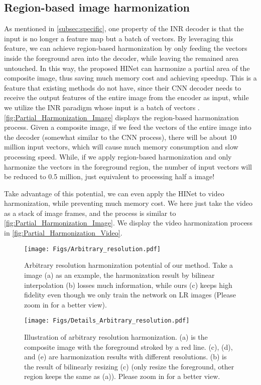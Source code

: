 \documentclass[10pt,journal,twocolumn,twoside]{IEEEtran}
\begin{document}
\subsection{Region-based image harmonization}
As mentioned in \cref{subsec:specific}, one property of the INR decoder is that the input is no longer a feature map but a batch of vectors. By leveraging this feature, we can achieve region-based harmonization by only feeding the vectors inside the foreground area into the decoder, while leaving the remained area untouched. In this way, the proposed HINet can harmonize a partial area of the composite image, thus saving much memory cost and achieving speedup. This is a feature that existing methods\cite{cong2022high, sofiiuk2021foreground, hang2022scs} do not have, since their CNN decoder needs to receive the output features of the entire image from the encoder as input, while we utilize the INR paradigm whose input is a batch of vectors . \cref{fig:Partial_Harmonization_Image} displays the region-based harmonization process. Given a  composite image, if we feed the vectors of the entire image into the decoder (somewhat similar to the CNN process), there will be about 10 million input vectors, which will cause much memory consumption and slow processing speed. While, if we apply region-based harmonization and only harmonize the vectors in the foreground region, the number of input vectors will be reduced to 0.5 million, just equivalent to processing half a  image!

Take advantage of this potential, we can even apply the HINet to video harmonization, while preventing much memory cost. We here just take the video as a stack of image frames, and the process is similar to \cref{fig:Partial_Harmonization_Image}. We display the video harmonization process in \cref{fig:Partial_Harmonization_Video}.


\begin{figure}[t]
  \centering
   \texttt{[image: Figs/Arbitrary\_resolution.pdf]}
   \caption{Arbitrary resolution harmonization potential of our method. Take a  image (a) as an example, the harmonization result by bilinear interpolation (b) losses much information, while ours (c) keeps high fidelity even though we only train the network on LR images (Please zoom in for a better view).}
   \label{fig:Arbitrary_resolution}
\end{figure}

\begin{figure}[t]
  \centering
   \texttt{[image: Figs/Details\_Arbitrary\_resolution.pdf]}
   \caption{Illustration of arbitrary resolution harmonization. (a) is the composite image with the foreground stroked by a red line. (c), (d), and (e) are harmonization results with different resolutions. (b) is the result of bilinearly resizing (c) (only resize the foreground, other region keeps the same as (a)). Please zoom in for a better view.}
   \label{fig:Details_Arbitrary_resolution}
\end{figure}
\end{document}

